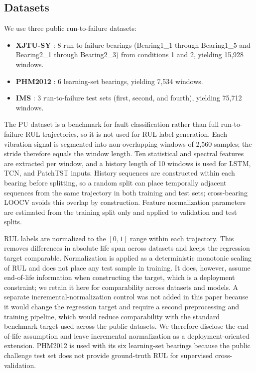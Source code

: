 \documentclass[pdflatex,sn-mathphys-num]{sn-jnl}
\begin{document}
\subsection{Datasets}
We use three public run-to-failure datasets:
\begin{itemize}
    \item \textbf{XJTU-SY} \cite{xjtusy2019dataset}: 8 run-to-failure bearings (Bearing1\_1 through Bearing1\_5 and Bearing2\_1 through Bearing2\_3) from conditions 1 and 2, yielding 15,928 windows.
    \item \textbf{PHM2012} \cite{nectoux2012pronostia}: 6 learning-set bearings, yielding 7,534 windows.
    \item \textbf{IMS} \cite{ims2006}: 3 run-to-failure test sets (first, second, and fourth), yielding 75,712 windows.
\end{itemize}
The PU dataset is a benchmark for fault classification rather than full run-to-failure RUL trajectories, so it is not used for RUL label generation. Each vibration signal is segmented into non-overlapping windows of 2,560 samples; the stride therefore equals the window length. Ten statistical and spectral features are extracted per window, and a history length of 10 windows is used for LSTM, TCN, and PatchTST inputs. History sequences are constructed within each bearing before splitting, so a random split can place temporally adjacent sequences from the same trajectory in both training and test sets; cross-bearing LOOCV avoids this overlap by construction. Feature normalization parameters are estimated from the training split only and applied to validation and test splits.

RUL labels are normalized to the $[0,1]$ range within each trajectory. This removes differences in absolute life span across datasets and keeps the regression target comparable. Normalization is applied as a deterministic monotonic scaling of RUL and does not place any test sample in training. It does, however, assume end-of-life information when constructing the target, which is a deployment constraint; we retain it here for comparability across datasets and models. A separate incremental-normalization control was not added in this paper because it would change the regression target and require a second preprocessing and training pipeline, which would reduce comparability with the standard benchmark target used across the public datasets. We therefore disclose the end-of-life assumption and leave incremental normalization as a deployment-oriented extension. PHM2012 is used with its six learning-set bearings because the public challenge test set does not provide ground-truth RUL for supervised cross-validation.
\end{document}
